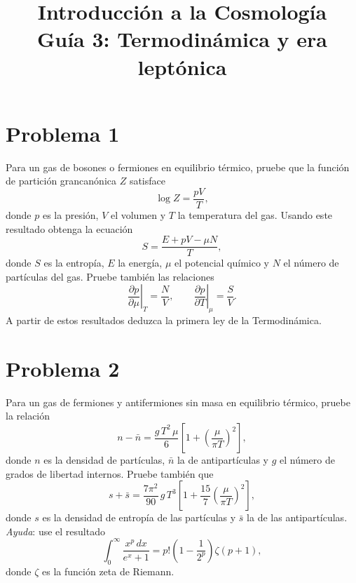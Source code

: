 \documentclass[11pt,a4paper]{article}
\title{\textbf{Introducción a la Cosmología \\ Guía 3: Termodinámica y era leptónica}}
\date{}
\begin{document}
\maketitle

\section*{Problema 1}
Para un gas de bosones o fermiones en equilibrio térmico, pruebe que la función de partición grancanónica $Z$ satisface
\begin{equation}
  \log Z=\frac{pV}{T},
\end{equation}
donde $p$ es la presión, $V$ el volumen y $T$ la temperatura del gas. Usando este resultado obtenga la ecuación
\begin{equation}
  S=\frac{E+pV-\mu N}{T},
\end{equation}
donde $S$ es la entropía, $E$ la energía, $\mu$ el potencial químico y $N$ el número de partículas del gas. Pruebe también las relaciones
\begin{equation}
  \left.\frac{\partial p}{\partial\mu}\right|_T=\frac{N}{V}, \qquad \left.\frac{\partial p}{\partial T}\right|_{\mu}=\frac{S}{V}.
\end{equation}
A partir de estos resultados deduzca la primera ley de la Termodinámica.

\section*{Problema 2}
Para un gas de fermiones y antifermiones sin masa en equilibrio térmico, pruebe la relación
\begin{equation}
  n-\bar n=\frac{g\,T^2\,\mu}{6}\left[1+\left(\frac{\mu}{\pi T}\right)^2\right],
\end{equation}
donde $n$ es la densidad de partículas, $\bar n$ la de antipartículas y $g$ el número de grados de libertad internos. Pruebe también que
\begin{equation}
  s+\bar s=\frac{7\pi^2}{90}\,g\,T^3\left[1+\frac{15}{7}\left(\frac{\mu}{\pi T}\right)^2\right],
\end{equation}
donde $s$ es la densidad de entropía de las partículas y $\bar s$ la de las antipartículas. \emph{Ayuda}: use el resultado
\begin{equation}
  \int_0^\infty \frac{x^p\,dx}{e^x+1}=p!\left(1-\frac{1}{2^p}\right)\zeta(p+1),
\end{equation}
donde $\zeta$ es la función zeta de Riemann.
\end{document}
